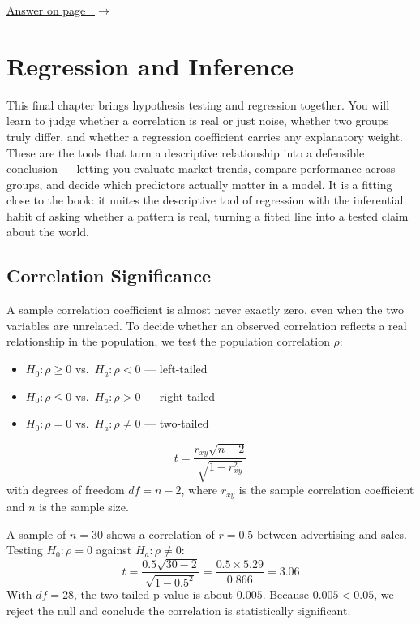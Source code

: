 \documentclass[
  11pt,
  letterpaper,
  DIV=11,
  numbers=noendperiod,
  oneside,
  open=any]{scrreprt}
\providecommand{\tightlist}{%
  \setlength{\itemsep}{0pt}\setlength{\parskip}{0pt}}\usepackage{longtable,booktabs,array}
\newcommand{\bsanswerref}[1]{%
  \par\nopagebreak\hypertarget{q-#1}{}\label{q-#1}%
  {\raggedleft\sffamily\footnotesize\hyperlink{a-#1}{\textcolor{bsaccent}{Answer on page \pageref{a-#1}\ $\rightarrow$}}\par}%
  \medskip}
\begin{document}
\bsanswerref{bsans129}

\chapter{Regression and Inference}\label{regression-and-inference}

This final chapter brings hypothesis testing and regression together.
You will learn to judge whether a correlation is real or just noise,
whether two groups truly differ, and whether a regression coefficient
carries any explanatory weight. These are the tools that turn a
descriptive relationship into a defensible conclusion --- letting you
evaluate market trends, compare performance across groups, and decide
which predictors actually matter in a model. It is a fitting close to
the book: it unites the descriptive tool of regression with the
inferential habit of asking whether a pattern is real, turning a fitted
line into a tested claim about the world.

\section{Correlation Significance}\label{correlation-significance}

A sample correlation coefficient is almost never exactly zero, even when
the two variables are unrelated. To decide whether an observed
correlation reflects a real relationship in the population, we test the
population correlation \(\rho\):

\begin{itemize}
\tightlist
\item
  \(H_0: \rho \geq 0\) vs.~\(H_a: \rho < 0\) --- left-tailed
\item
  \(H_0: \rho \leq 0\) vs.~\(H_a: \rho > 0\) --- right-tailed
\item
  \(H_0: \rho = 0\) vs.~\(H_a: \rho \ne 0\) --- two-tailed
\end{itemize}

\begin{bsformula}

\[t = \frac{r_{xy}\sqrt{n-2}}{\sqrt{1-r_{xy}^2}}\] with degrees of
freedom \(df = n - 2\), where \(r_{xy}\) is the sample correlation
coefficient and \(n\) is the sample size.

\end{bsformula}

\begin{bsexample}[Example]

A sample of \(n = 30\) shows a correlation of \(r = 0.5\) between
advertising and sales. Testing \(H_0: \rho = 0\) against
\(H_a: \rho \ne 0\):
\[t = \frac{0.5\sqrt{30-2}}{\sqrt{1-0.5^2}} = \frac{0.5 \times 5.29}{0.866} = 3.06\]
With \(df = 28\), the two-tailed p-value is about \(0.005\). Because
\(0.005 < 0.05\), we reject the null and conclude the correlation is
statistically significant.

\end{bsexample}
\end{document}
